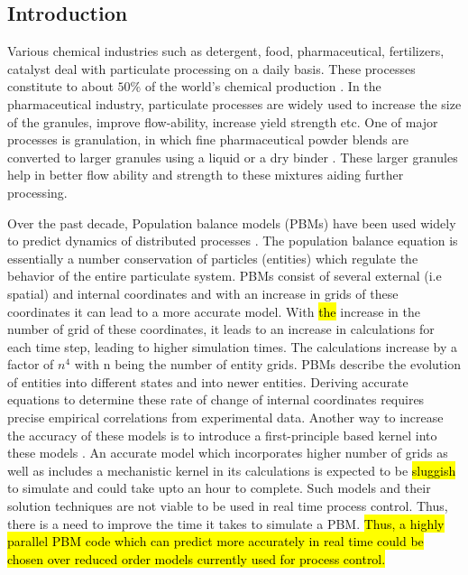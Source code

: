 \documentclass[review]{elsarticle}
\begin{document}
\begin{linenumbers}
\section{Introduction}
\label{secIntro}
Various chemical industries such as detergent, food, pharmaceutical, fertilizers, catalyst 
deal with particulate processing on a daily basis. These processes constitute to about 
$50\%$ of the world's chemical production \citep{seville1997}.
In the pharmaceutical industry, particulate processes are widely used to increase 
the size of the granules, improve flow-ability, increase yield strength etc. One of 
major processes is granulation, in which fine pharmaceutical powder 
blends are converted to larger granules using a liquid or a dry binder \citep{Chaturbedi2017}. 
These larger granules help in better flow ability and strength to these mixtures 
aiding further processing. 

Over the past decade, Population balance models (PBMs) have been used widely to predict 
dynamics of distributed processes \citep{ramkrishna2014}. The population 
balance equation is essentially a number conservation of particles (entities) which 
regulate the behavior of the entire particulate system. PBMs consist of several 
external (i.e spatial) and internal coordinates and with an increase in grids of 
these coordinates it can lead to a more accurate model.  With \hl{the} increase in 
the number of grid of these coordinates, it 
leads to an increase in calculations for each time step, leading to higher 
simulation times. The calculations increase by a factor of $n^4$ with n being the 
number of entity grids. PBMs describe the evolution of entities into different states and 
into newer entities. Deriving accurate equations to determine these rate of change 
of internal coordinates requires precise empirical correlations from 
experimental data. Another way to increase the accuracy of these models 
is to introduce a first-principle based kernel into these models \citep{Barrasso2015cerd}. 
An accurate model which incorporates higher number of grids as well as includes a 
mechanistic kernel in its calculations is expected to be \hl{sluggish} to simulate and could 
take upto an hour \citep{Barrasso2015ces} to complete. Such models and their 
solution techniques are not viable to be used in real time process control. Thus, 
there is a need to improve the time it takes to simulate a PBM. \hl{Thus, a highly parallel
PBM code which can predict more accurately in real time could be chosen over reduced order 
models currently used for process control.}


\end{linenumbers}
\end{document}
